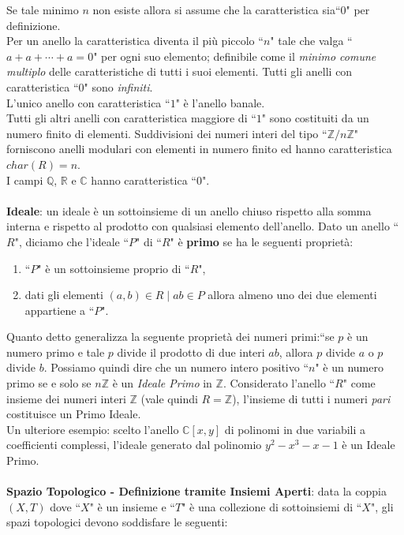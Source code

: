 \documentclass[a4paper,12pt]{tesiinfo}
\begin{document}
Se tale minimo $n$ non esiste allora si assume che la caratteristica sia``0" per definizione.
\\
Per un anello la caratteristica diventa il pi\`u piccolo ``$n$" tale che valga ``$a+a+\cdots+a{{=}}0$" per ogni suo elemento; definibile come il \textit{minimo comune multiplo} delle caratteristiche di tutti i suoi elementi. 
Tutti gli anelli con caratteristica ``$0$" sono \textit{infiniti}.
\\
L'unico anello con caratteristica ``$1$" \`e l'anello banale.
\\
Tutti gli altri anelli con caratteristica maggiore di ``$1$" sono costituiti da un numero finito di elementi. Suddivisioni dei numeri interi del tipo ``$\mathbb{Z}/n\mathbb{Z}$" forniscono anelli modulari con elementi in numero finito ed hanno caratteristica $char(R) = n$.\\
I campi $\mathbb{Q}$, $\mathbb{R}$ e $\mathbb{C}$ hanno caratteristica ``$0$".
\\\\
%
%
%
\textbf{Ideale}: un ideale \`e un sottoinsieme di un anello chiuso rispetto alla somma interna e rispetto al prodotto con qualsiasi elemento dell'anello.
Dato un anello ``$R$", diciamo che l'ideale ``$P$" di ``$R$" \`e \textbf{primo} se ha le seguenti propriet\`a:
\begin{enumerate}
    \item ``$P$" \`e un sottoinsieme proprio di ``$R$",
    \item dati gli elementi $(a, b) \in R \mid ab \in P$ allora almeno uno dei due elementi appartiene a ``$P$".
\end{enumerate}
Quanto detto generalizza la seguente propriet\`a dei numeri primi:``se $p$ \`e un numero primo e tale $p$ divide il prodotto di due interi $ab$, allora $p$ divide $a$ o $p$ divide $b$. Possiamo quindi dire che un numero intero positivo ``$n$" \`e un numero primo se e solo se $n\mathbb{Z}$ \`e un \textit{Ideale Primo} in $\mathbb{Z}$. Considerato l'anello ``$R$" come insieme dei numeri interi $\mathbb{Z}$ (vale quindi $R = \mathbb{Z}$), l'insieme di tutti i numeri \textit{pari} costituisce un Primo Ideale.
\\
Un ulteriore esempio: scelto l'anello $\mathbb{C}[x, y]$ di polinomi in due variabili a coefficienti complessi, l'ideale generato dal polinomio $y^2 - x^3 -x -1$ \`e un Ideale Primo.
\\\\
%
%
%
\textbf{Spazio Topologico - Definizione tramite Insiemi Aperti}: data la coppia $(X, T)$ dove ``$X$" \`e un insieme e ``$T$" \`e una collezione di sottoinsiemi di ``$X$", gli spazi topologici devono soddisfare le seguenti:
\end{document}

